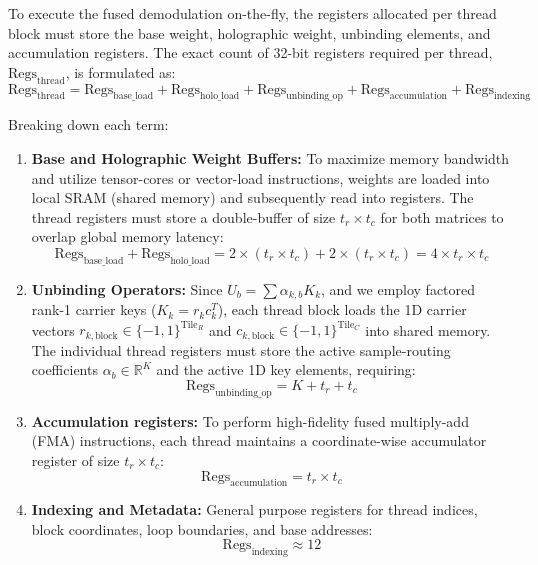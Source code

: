 \documentclass{article}
\theoremstyle{plain}
\theoremstyle{definition}
\theoremstyle{remark}
\begin{document}
To execute the fused demodulation on-the-fly, the registers allocated per thread block must store the base weight, holographic weight, unbinding elements, and accumulation registers. The exact count of 32-bit registers required per thread, $\text{Regs}_{\text{thread}}$, is formulated as:
\begin{equation}
\text{Regs}_{\text{thread}} = \text{Regs}_{\text{base\_load}} + \text{Regs}_{\text{holo\_load}} + \text{Regs}_{\text{unbinding\_op}} + \text{Regs}_{\text{accumulation}} + \text{Regs}_{\text{indexing}}
\end{equation}

Breaking down each term:
\begin{enumerate}
\item \textbf{Base and Holographic Weight Buffers:} To maximize memory bandwidth and utilize tensor-cores or vector-load instructions, weights are loaded into local SRAM (shared memory) and subsequently read into registers. The thread registers must store a double-buffer of size $t_r \times t_c$ for both matrices to overlap global memory latency:
\begin{equation}
\text{Regs}_{\text{base\_load}} + \text{Regs}_{\text{holo\_load}} = 2 \times (t_r \times t_c) + 2 \times (t_r \times t_c) = 4 \times t_r \times t_c
\end{equation}
\item \textbf{Unbinding Operators:} Since $U_b = \sum \alpha_{k, b} K_k$, and we employ factored rank-1 carrier keys ($K_k = r_k c_k^T$), each thread block loads the 1D carrier vectors $r_{k, \text{block}} \in \{-1, 1\}^{\text{Tile}_R}$ and $c_{k, \text{block}} \in \{-1, 1\}^{\text{Tile}_C}$ into shared memory. The individual thread registers must store the active sample-routing coefficients $\alpha_b \in \mathbb{R}^K$ and the active 1D key elements, requiring:
\begin{equation}
\text{Regs}_{\text{unbinding\_op}} = K + t_r + t_c
\end{equation}
\item \textbf{Accumulation registers:} To perform high-fidelity fused multiply-add (FMA) instructions, each thread maintains a coordinate-wise accumulator register of size $t_r \times t_c$:
\begin{equation}
\text{Regs}_{\text{accumulation}} = t_r \times t_c
\end{equation}
\item \textbf{Indexing and Metadata:} General purpose registers for thread indices, block coordinates, loop boundaries, and base addresses:
\begin{equation}
\text{Regs}_{\text{indexing}} \approx 12
\end{equation}
\end{enumerate}
\end{document}
